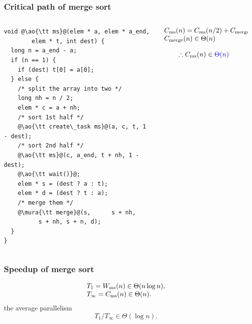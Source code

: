 \documentclass[12pt,dvipdfmx]{beamer}
\newcommand{\mura}[1]{{\color{purple}#1}}
\newcommand{\ao}[1]{{\color{blue}#1}}
\begin{document}
\begin{frame}[fragile]
\frametitle{Critical path of merge sort}

\begin{columns}
\begin{column}{0.48\textwidth}
\begin{lstlisting}
void @\ao{\tt ms}@(elem * a, elem * a_end, 
        elem * t, int dest) {
  long n = a_end - a;
  if (n == 1) {
    if (dest) t[0] = a[0];
  } else {
    /* split the array into two */
    long nh = n / 2;
    elem * c = a + nh;
    /* sort 1st half */
    @\ao{\tt create\_task ms}@(a, c, t, 1 - dest);
    /* sort 2nd half */
    @\ao{\tt ms}@(c, a_end, t + nh, 1 - dest);
    @\ao{\tt wait()}@;
    elem * s = (dest ? a : t);
    elem * d = (dest ? t : a);
    /* merge them */
    @\mura{\tt merge}@(s,      s + nh, 
          s + nh, s + n, d);
  }
}
\end{lstlisting}
\end{column}

\begin{column}{0.52\textwidth}
\[ 
\begin{array}{l}
C_{\mbox{\scriptsize ms}}(n)
= C_{\mbox{\scriptsize ms}}(n/2)
+ C_{\mbox{\scriptsize merge}}(n), \\
C_{\mbox{\scriptsize merge}}(n) \in \Theta(n)
\end{array}
\]

\[ \therefore C_{\mbox{\scriptsize ms}}(n) \in \ao{\Theta(n)} \]
\end{column}
\end{columns}
\end{frame}

\begin{frame}
\frametitle{Speedup of merge sort}
\[ 
\begin{array}{l}
T_1 = W_{\mbox{\scriptsize ms}}(n) \in \Theta(n\log n), \\
T_\infty = C_{\mbox{\scriptsize ms}}(n) \in \Theta(n).
\end{array}
\]
the average parallelism
\[ T_1/T_\infty \in \Theta(\log n). \]
\end{frame}

\end{document}
